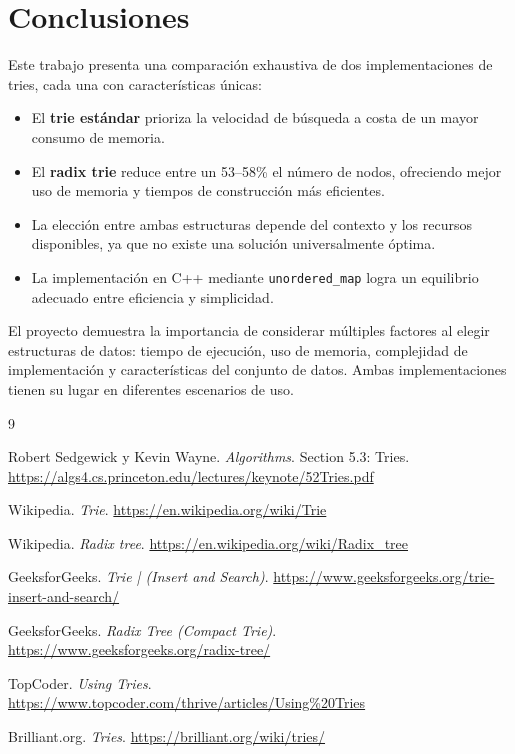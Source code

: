 \documentclass[11pt,a4paper]{article}
\begin{document}
\section{Conclusiones}

Este trabajo presenta una comparación exhaustiva de dos implementaciones de tries, cada una con características únicas:


    \begin{itemize}
    \item El \textbf{trie estándar} prioriza la velocidad de búsqueda a costa de un mayor consumo de memoria.
    \item El \textbf{radix trie} reduce entre un 53–58\% el número de nodos, ofreciendo mejor uso de memoria y tiempos de construcción más eficientes.
    \item La elección entre ambas estructuras depende del contexto y los recursos disponibles, ya que no existe una solución universalmente óptima.
    \item La implementación en C++ mediante \texttt{unordered\_map} logra un equilibrio adecuado entre eficiencia y simplicidad.
\end{itemize}


El proyecto demuestra la importancia de considerar múltiples factores al elegir estructuras de datos: tiempo de ejecución, uso de memoria, complejidad de implementación y características del conjunto de datos. Ambas implementaciones tienen su lugar en diferentes escenarios de uso.

\begin{thebibliography}{9}

Robert Sedgewick y Kevin Wayne. \textit{Algorithms}. Section 5.3: Tries. 
\url{https://algs4.cs.princeton.edu/lectures/keynote/52Tries.pdf}

Wikipedia. \textit{Trie}. 
\url{https://en.wikipedia.org/wiki/Trie}

Wikipedia. \textit{Radix tree}. 
\url{https://en.wikipedia.org/wiki/Radix_tree}

GeeksforGeeks. \textit{Trie | (Insert and Search)}. 
\url{https://www.geeksforgeeks.org/trie-insert-and-search/}

GeeksforGeeks. \textit{Radix Tree (Compact Trie)}. 
\url{https://www.geeksforgeeks.org/radix-tree/}

TopCoder. \textit{Using Tries}. 
\url{https://www.topcoder.com/thrive/articles/Using%20Tries}

Brilliant.org. \textit{Tries}. 
\url{https://brilliant.org/wiki/tries/}

\end{thebibliography}
\end{document}
